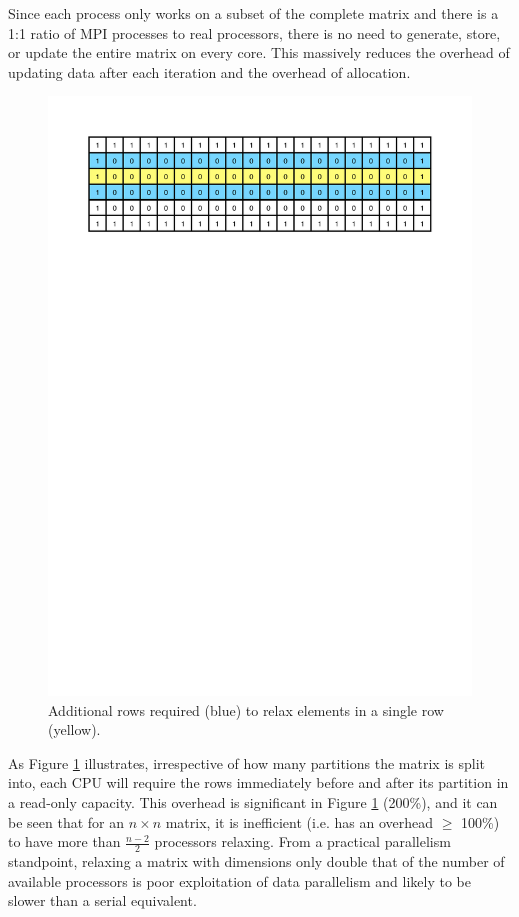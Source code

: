 \documentclass[12pt]{article}
\begin{document}
Since each process only works on a subset of the complete matrix and there is a 1:1 ratio of MPI processes to real processors, there is no need to generate, store, or update the entire matrix on every core. This massively reduces the overhead of updating data after each iteration and the overhead of allocation.

\begin{figure}[!htbp]
        \centering\includegraphics[width=.9\textwidth]{img/rowduplication.pdf}
        \caption{Additional rows required (blue) to relax elements in a single row (yellow).}
        \label{fig:duplicates}
    \end{figure}

As Figure \ref{fig:duplicates} illustrates, irrespective of how many partitions the matrix is split into, each CPU will require the rows immediately before and after its partition in a read-only capacity. This overhead is significant in Figure \ref{fig:duplicates} (200\%), and it can be seen that for an $n\times{n}$ matrix, it is inefficient (i.e. has an overhead $\geq$ 100\%) to have more than $\frac{n-2}{2}$ processors relaxing. From a practical parallelism standpoint, relaxing a matrix with dimensions only double that of the number of available processors is poor exploitation of data parallelism and likely to be slower than a serial equivalent.
\end{document}
